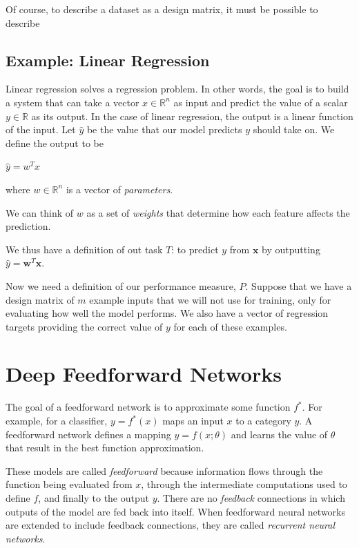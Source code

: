 \documentclass{report}
\begin{document}
\noindent Of course, to describe a dataset as a design matrix, it must be possible to describe 



\section{Example: Linear Regression}
Linear regression solves a regression problem. In other words, the goal is to build a system that can take a vector $x \in \mathbb{R}^n$ as input and predict the value of a scalar $y \in \mathbb{R}$ as its output. In the case of linear regression, the output is a linear function of the input. Let $\hat{y}$ be the value that our model predicts $y$ should take on. We define the output to be\newline
    \centerline{$\hat{y}= w^T x $}\newline
where $w \in \mathbb{R}^n$ is a vector of \textit{parameters}.\newline

We can think of $w$ as a set of \textit{weights} that determine how each feature affects the prediction.\newline

We thus have a definition of out task $T$: to predict $y$ from $\mathbf{x}$ by outputting $\hat{y}=\mathbf{w}^T\mathbf{x}$.\newline

Now we need a definition of our performance measure, $P$. Suppose that we have a design matrix of $m$ example inputs that we will not use for training, only for evaluating how well the model performs. We also have a vector of regression targets providing the correct value of $y$ for each of these examples. 

\chapter{Deep Feedforward Networks}
The goal of a feedforward network is to approximate some function $f^*$. For example, for a classifier, $y=f^*(x)$ maps an input $x$ to a category $y$. A feedforward network defines a mapping $y=f(x;\theta)$ and learns the value of $\theta$ that result in the best function approximation.\newline

\noindent These models are called \textit{feedforward} because information flows through the function being evaluated from $x$, through the intermediate computations used to define $f$, and finally to the output $y$. There are no \textit{feedback} connections in which outputs of the model are fed back into itself. When feedforward neural networks are extended to include  feedback connections, they are called \textit{recurrent neural networks}.\newline
\end{document}
